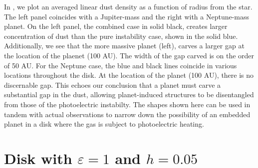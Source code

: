 \documentclass[onecolumn]{report}
\newcommand{\epsi}{\varepsilon}
\begin{document}
In , we plot an averaged linear dust density as a function of radius from the star. The left panel coincides with a Jupiter-mass and the right with a Neptune-mass planet. On the left panel, the combined case in solid black, creates larger concentration of dust than the pure instability case, shown in the solid blue. Additionally, we see that the more massive planet (left), carves a larger gap at the location of the plaenet (100 AU). The width of the gap carved is on the order of 50 AU. For the Neptune case, the blue and black lines coincide in various locations throughout the disk. At the location of the planet (100 AU), there is no discernable gap. This echoes our conclusion that a planet must carve a substantial gap in the dust, allowing planet-induced structures to be disentangled from those of the photoelectric instabilty. The shapes shown here can be used in tandem with actual observations to narrow down the possibility of an embedded planet in a disk where the gas is subject to photoelectric heating.

\section{Disk with $\epsi=1$ and $h=0.05$}
\end{document}
